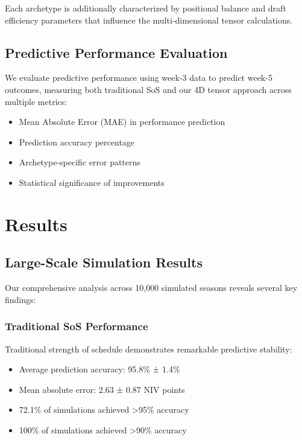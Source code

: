 \documentclass[11pt]{article}
\begin{document}
Each archetype is additionally characterized by positional balance and draft efficiency parameters that influence the multi-dimensional tensor calculations.

\subsection{Predictive Performance Evaluation}

We evaluate predictive performance using week-3 data to predict week-5 outcomes, measuring both traditional SoS and our 4D tensor approach across multiple metrics:

\begin{itemize}
    \item Mean Absolute Error (MAE) in performance prediction
    \item Prediction accuracy percentage
    \item Archetype-specific error patterns
    \item Statistical significance of improvements
\end{itemize}

\section{Results}

\subsection{Large-Scale Simulation Results}

Our comprehensive analysis across 10,000 simulated seasons reveals several key findings:

\subsubsection{Traditional SoS Performance}

Traditional strength of schedule demonstrates remarkable predictive stability:
\begin{itemize}
    \item Average prediction accuracy: 95.8\% ± 1.4\%
    \item Mean absolute error: 2.63 ± 0.87 NIV points
    \item 72.1\% of simulations achieved >95\% accuracy
    \item 100\% of simulations achieved >90\% accuracy
\end{itemize}
\end{document}
